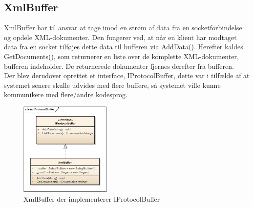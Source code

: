 \subsection{XmlBuffer}
XmlBuffer har til ansvar at tage imod en strøm af data fra en socketforbindelse og opdele XML-dokumenter. Den fungerer ved, at når en klient har modtaget data fra en socket tilføjes dette data til bufferen via AddData(). Herefter kaldes GetDocuments(), som returnerer en liste over de komplette XML-dokumenter, bufferen indeholder. De returnerede dokumenter fjernes derefter fra bufferen.\\

Der blev derudover oprettet et interface, IProtocolBuffer, dette var i tilfælde af at systemet senere skulle udvides med flere buffere, så systemet ville kunne kommunikere med flere/andre kodesprog.

\begin{figure}[H]
	\centering
	\includegraphics[width=0.4\textwidth]{Systemdesign/SharedLib/Images/Klasser/IProtocolBuffer.png}
	\caption{XmlBuffer der implementerer IProtocolBuffer}
	\label{fig:klasseXmlBuf}
\end{figure}
